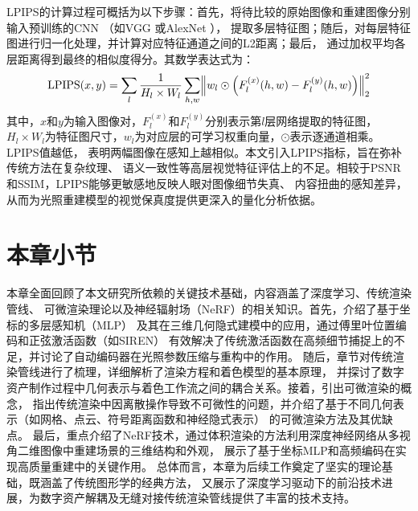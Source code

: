 LPIPS的计算过程可概括为以下步骤：首先，将待比较的原始图像和重建图像分别输入预训练的CNN
（如VGG \cite{journals/corr/SimonyanZ14a}或AlexNet \cite{NIPS2012_c399862d}），
提取多层特征图；随后，对每层特征图进行归一化处理，并计算对应特征通道之间的L2距离；最后，
通过加权平均各层距离得到最终的相似度得分。其数学表达式为：
\begin{equation}\label{eq:lpips}
  \mathrm{LPIPS}(x,y)=
  \sum_{l}\frac{1}{H_{l}\times W_{l}}
  \sum_{h,w} \Bigl \Vert w_{l} \odot \Bigl(F_{l}^{(x)}(h,w)-F_{l}^{(y)}(h,w) \Bigr) \Bigr \Vert_{2}^{2}
\end{equation}
其中，$x$和$y$为输入图像对，$F_{l}^{(x)}$和$F_{l}^{(y)}$分别表示第$l$层网络提取的特征图，
$H_{l}\times W_{l}$为特征图尺寸，$w_{l}$为对应层的可学习权重向量，$\odot$表示逐通道相乘。LPIPS值越低，
表明两幅图像在感知上越相似。本文引入LPIPS指标，旨在弥补传统方法在复杂纹理、
语义一致性等高层视觉特征评估上的不足。相较于PSNR和SSIM，LPIPS能够更敏感地反映人眼对图像细节失真、
内容扭曲的感知差异，从而为光照重建模型的视觉保真度提供更深入的量化分析依据。

\section{本章小节}
本章全面回顾了本文研究所依赖的关键技术基础，内容涵盖了深度学习、传统渲染管线、
可微渲染理论以及神经辐射场（NeRF）的相关知识。首先，介绍了基于坐标的多层感知机（MLP）
及其在三维几何隐式建模中的应用，通过傅里叶位置编码和正弦激活函数（如SIREN）
有效解决了传统激活函数在高频细节捕捉上的不足，并讨论了自动编码器在光照参数压缩与重构中的作用。
随后，章节对传统渲染管线进行了梳理，详细解析了渲染方程和着色模型的基本原理，
并探讨了数字资产制作过程中几何表示与着色工作流之间的耦合关系。接着，引出可微渲染的概念，
指出传统渲染中因离散操作导致不可微性的问题，并介绍了基于不同几何表示（如网格、点云、符号距离函数和神经隐式表示）
的可微渲染方法及其优缺点。
最后，重点介绍了NeRF技术，通过体积渲染的方法利用深度神经网络从多视角二维图像中重建场景的三维结构和外观，
展示了基于坐标MLP和高频编码在实现高质量重建中的关键作用。
总体而言，本章为后续工作奠定了坚实的理论基础，既涵盖了传统图形学的经典方法，
又展示了深度学习驱动下的前沿技术进展，为数字资产解耦及无缝对接传统渲染管线提供了丰富的技术支持。

